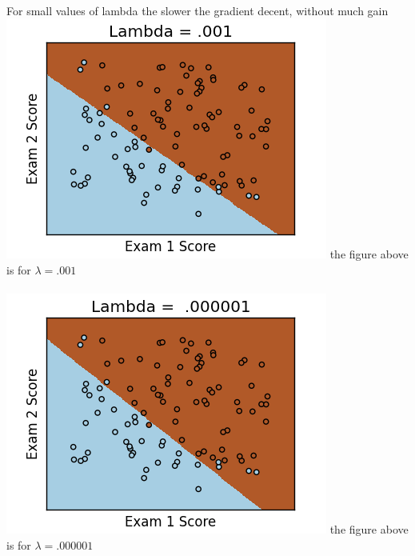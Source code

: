 \documentclass{article}
\begin{document}
\paragraph{}
For small values of lambda the slower the gradient decent, without much gain  
\linebreak
\includegraphics[width = \linewidth]{Lambda_001.png}
\linebreak
the figure above is for $ \lambda = .001$ 
\paragraph{}
\includegraphics[width = \linewidth]{Lambda_000001.png}
the figure above is for $ \lambda = .000001$ 

 
\end{document}
